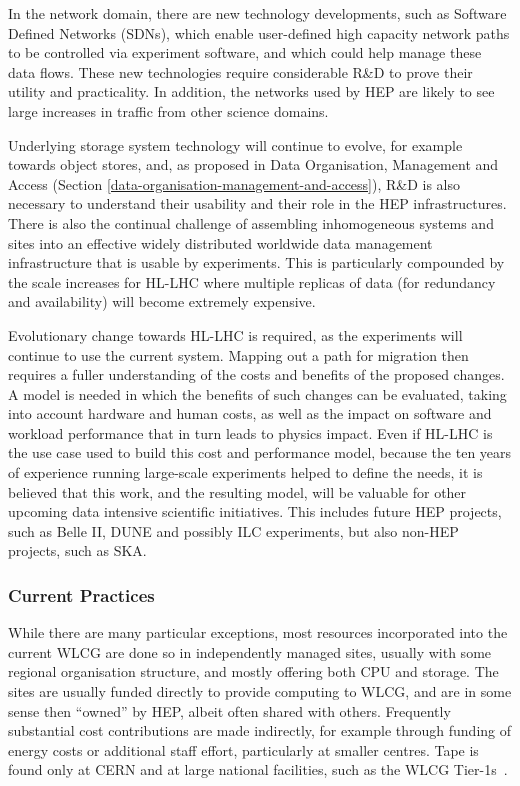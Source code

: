 \documentclass[12pt,a4paper]{article}
\begin{document}
In the network domain, there are new technology developments, such as
Software Defined Networks (SDNs), which enable user-defined high
capacity network paths to be controlled via experiment software, and
which could help manage these data flows. These new technologies require
considerable R\&D to prove their utility and practicality. In addition,
the networks used by HEP are likely to see large increases in traffic
from other science domains.

Underlying storage system technology will continue to evolve, for
example towards object stores, and, as proposed in  
Data Organisation, Management and Access  
(Section \ref{data-organisation-management-and-access}),
R\&D is also necessary to understand their usability and their role in
the HEP infrastructures. There is also the continual challenge of
assembling inhomogeneous systems and sites into an effective widely
distributed worldwide data management infrastructure that is usable by
experiments. This is particularly compounded by the scale increases for
HL-LHC where multiple replicas of data (for redundancy and availability)
will become extremely expensive.

Evolutionary change towards HL-LHC is required, as the experiments will
continue to use the current system. Mapping out a path for migration
then requires a fuller understanding of the costs and benefits of the
proposed changes. A model is needed in which the benefits of such
changes can be evaluated, taking into account hardware and human costs,
as well as the impact on software and workload performance that in turn
leads to physics impact. Even if HL-LHC is the use case used to build
this cost and performance model, because the ten years of experience
running large-scale experiments helped to define the needs, it is
believed that this work, and the resulting model, will be valuable for
other upcoming data intensive scientific initiatives. This includes
future HEP projects, such as Belle II, DUNE and possibly ILC
experiments, but also non-HEP projects, such as SKA.

\subsubsection*{Current Practices}

While there are many particular exceptions, most resources incorporated
into the current WLCG are done so in independently managed sites,
usually with some regional organisation structure, and mostly offering
both CPU and storage. The sites are usually funded directly to provide
computing to WLCG, and are in some sense then ``owned'' by HEP, albeit
often shared with others. Frequently substantial cost contributions are
made indirectly, for example through funding of energy costs or
additional staff effort, particularly at smaller centres. Tape is found
only at CERN and at large national facilities, such as the WLCG Tier-1s~\cite{Bird:1695401}.
\end{document}
